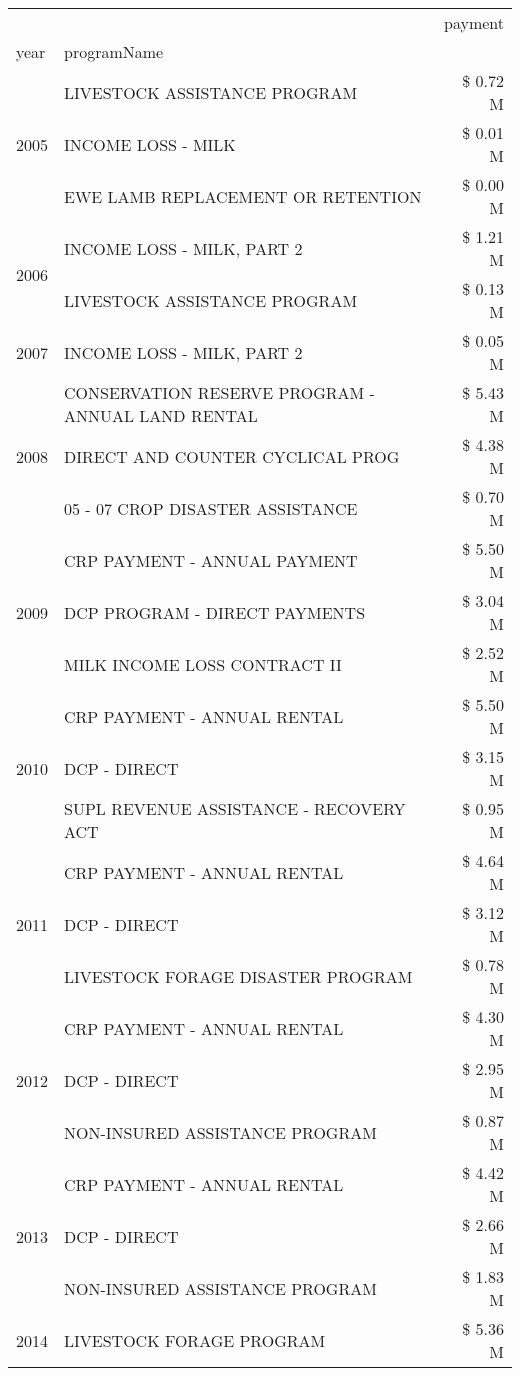 \begin{tabular}{llr}
\toprule
 &  & payment \\
year & programName &  \\
\midrule
\multirow[t]{3}{*}{2005} & LIVESTOCK ASSISTANCE PROGRAM & \$ 0.72 M \\
 & INCOME LOSS - MILK & \$ 0.01 M \\
 & EWE LAMB REPLACEMENT OR RETENTION & \$ 0.00 M \\
\cline{1-3}
\multirow[t]{2}{*}{2006} & INCOME LOSS - MILK, PART 2 & \$ 1.21 M \\
 & LIVESTOCK ASSISTANCE PROGRAM & \$ 0.13 M \\
\cline{1-3}
2007 & INCOME LOSS - MILK, PART 2 & \$ 0.05 M \\
\cline{1-3}
\multirow[t]{3}{*}{2008} & CONSERVATION RESERVE PROGRAM - ANNUAL LAND RENTAL & \$ 5.43 M \\
 & DIRECT AND COUNTER CYCLICAL PROG & \$ 4.38 M \\
 & 05 - 07 CROP DISASTER ASSISTANCE & \$ 0.70 M \\
\cline{1-3}
\multirow[t]{3}{*}{2009} & CRP PAYMENT - ANNUAL PAYMENT & \$ 5.50 M \\
 & DCP PROGRAM - DIRECT PAYMENTS & \$ 3.04 M \\
 & MILK INCOME LOSS CONTRACT II & \$ 2.52 M \\
\cline{1-3}
\multirow[t]{3}{*}{2010} & CRP PAYMENT - ANNUAL RENTAL & \$ 5.50 M \\
 & DCP - DIRECT & \$ 3.15 M \\
 & SUPL REVENUE ASSISTANCE - RECOVERY ACT & \$ 0.95 M \\
\cline{1-3}
\multirow[t]{3}{*}{2011} & CRP PAYMENT - ANNUAL RENTAL & \$ 4.64 M \\
 & DCP - DIRECT & \$ 3.12 M \\
 & LIVESTOCK FORAGE DISASTER PROGRAM & \$ 0.78 M \\
\cline{1-3}
\multirow[t]{3}{*}{2012} & CRP PAYMENT - ANNUAL RENTAL & \$ 4.30 M \\
 & DCP - DIRECT & \$ 2.95 M \\
 & NON-INSURED ASSISTANCE PROGRAM & \$ 0.87 M \\
\cline{1-3}
\multirow[t]{3}{*}{2013} & CRP PAYMENT - ANNUAL RENTAL & \$ 4.42 M \\
 & DCP - DIRECT & \$ 2.66 M \\
 & NON-INSURED ASSISTANCE PROGRAM & \$ 1.83 M \\
\cline{1-3}
\multirow[t]{3}{*}{2014} & LIVESTOCK FORAGE PROGRAM & \$ 5.36 M \\

\end{tabular}

